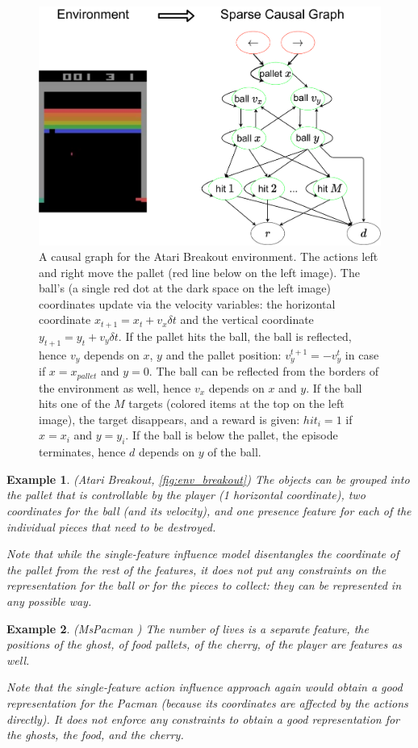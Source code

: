 \documentclass[a4paper,11pt,oneside]{report}
\newtheorem{example}{Example}[section]
\begin{document}
\begin{figure}
    \centering
    \includegraphics[width=0.7\linewidth]{diagrams/env_breakout}
    \caption{A causal graph for the Atari Breakout environment. The actions left and right move the pallet (red line below on the left image). The ball's (a single red dot at the dark space on the left image) coordinates update via the velocity variables: the horizontal coordinate $x_{t+1}=x_t+v_x \delta t$ and the vertical coordinate $y_{t+1}=y_t+v_y\delta t$. If the pallet hits the ball, the ball is reflected, hence $v_y$ depends on $x$, $y$ and the pallet position: $v_y^{t+1}=-v_y^t$ in case if $x=x_{pallet}$ and $y=0$. The ball can be reflected from the borders of the environment as well, hence $v_x$ depends on $x$ and $y$. If the ball hits one of the $M$ targets (colored items at the top on the left image), the target disappears, and a reward is given: $hit_i=1$ if $x=x_i$ and $y=y_i$. If the ball is below the pallet, the episode terminates, hence $d$ depends on $y$ of the ball.}
    \label{fig:env_breakout}
\end{figure}


\begin{example}{(Atari \cite{brockman2016openai} Breakout, \autoref{fig:env_breakout})}
    The objects can be grouped into the pallet that is controllable by the player (1 horizontal coordinate), two coordinates for the ball (and its velocity), and one presence feature for each of the individual pieces that need to be destroyed.

    Note that while the single-feature influence model disentangles the coordinate of the pallet from the rest of the features, it does not put any constraints on the representation for the ball or for the pieces to collect: they can be represented in any possible way.
\end{example}

\begin{example}{(MsPacman \cite{brockman2016openai})}
   The number of lives is a separate feature, the positions of the ghost, of food pallets, of the cherry, of the player are features as well.

   Note that the single-feature action influence approach again would obtain a good representation for the Pacman (because its coordinates are affected by the actions directly). It does not enforce any constraints to obtain a good representation for the ghosts, the food, and the cherry.
\end{example}
\end{document}
